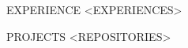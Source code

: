 \documentclass{resume} %
\begin{document}






\begin{rSection}{EXPERIENCE}
    <EXPERIENCES>
\end{rSection}



\begin{rSection}{PROJECTS}    
    <REPOSITORIES>
\end{rSection}










    
\end{document}

